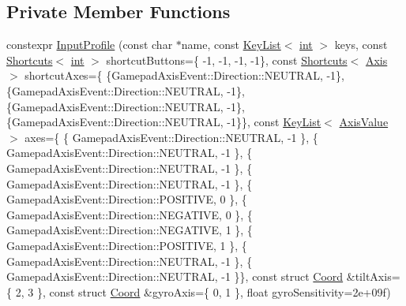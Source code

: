 \subsection*{Private Member Functions}
\begin{DoxyCompactItemize}
\item 
constexpr \mbox{\hyperlink{class_q_g_b_a_1_1_input_profile_a811607e27c5154082ba5bc37953fc96d}{Input\+Profile}} (const char $\ast$name, const \mbox{\hyperlink{class_q_g_b_a_1_1_input_profile_struct_q_g_b_a_1_1_input_profile_1_1_key_list}{Key\+List}}$<$ \mbox{\hyperlink{ioapi_8h_a787fa3cf048117ba7123753c1e74fcd6}{int}} $>$ keys, const \mbox{\hyperlink{class_q_g_b_a_1_1_input_profile_struct_q_g_b_a_1_1_input_profile_1_1_shortcuts}{Shortcuts}}$<$ \mbox{\hyperlink{ioapi_8h_a787fa3cf048117ba7123753c1e74fcd6}{int}} $>$ shortcut\+Buttons=\{ -\/1, -\/1, -\/1, -\/1\}, const \mbox{\hyperlink{class_q_g_b_a_1_1_input_profile_struct_q_g_b_a_1_1_input_profile_1_1_shortcuts}{Shortcuts}}$<$ \mbox{\hyperlink{class_q_g_b_a_1_1_input_profile_struct_q_g_b_a_1_1_input_profile_1_1_axis}{Axis}} $>$ shortcut\+Axes=\{ \{Gamepad\+Axis\+Event\+::\+Direction\+::\+N\+E\+U\+T\+R\+AL, -\/1\}, \{Gamepad\+Axis\+Event\+::\+Direction\+::\+N\+E\+U\+T\+R\+AL, -\/1\}, \{Gamepad\+Axis\+Event\+::\+Direction\+::\+N\+E\+U\+T\+R\+AL, -\/1\}, \{Gamepad\+Axis\+Event\+::\+Direction\+::\+N\+E\+U\+T\+R\+AL, -\/1\}\}, const \mbox{\hyperlink{class_q_g_b_a_1_1_input_profile_struct_q_g_b_a_1_1_input_profile_1_1_key_list}{Key\+List}}$<$ \mbox{\hyperlink{class_q_g_b_a_1_1_input_profile_struct_q_g_b_a_1_1_input_profile_1_1_axis_value}{Axis\+Value}} $>$ axes=\{ \{ Gamepad\+Axis\+Event\+::\+Direction\+::\+N\+E\+U\+T\+R\+AL, -\/1 \}, \{ Gamepad\+Axis\+Event\+::\+Direction\+::\+N\+E\+U\+T\+R\+AL, -\/1 \}, \{ Gamepad\+Axis\+Event\+::\+Direction\+::\+N\+E\+U\+T\+R\+AL, -\/1 \}, \{ Gamepad\+Axis\+Event\+::\+Direction\+::\+N\+E\+U\+T\+R\+AL, -\/1 \}, \{ Gamepad\+Axis\+Event\+::\+Direction\+::\+P\+O\+S\+I\+T\+I\+VE, 0 \}, \{ Gamepad\+Axis\+Event\+::\+Direction\+::\+N\+E\+G\+A\+T\+I\+VE, 0 \}, \{ Gamepad\+Axis\+Event\+::\+Direction\+::\+N\+E\+G\+A\+T\+I\+VE, 1 \}, \{ Gamepad\+Axis\+Event\+::\+Direction\+::\+P\+O\+S\+I\+T\+I\+VE, 1 \}, \{ Gamepad\+Axis\+Event\+::\+Direction\+::\+N\+E\+U\+T\+R\+AL, -\/1 \}, \{ Gamepad\+Axis\+Event\+::\+Direction\+::\+N\+E\+U\+T\+R\+AL, -\/1 \}\}, const struct \mbox{\hyperlink{class_q_g_b_a_1_1_input_profile_struct_q_g_b_a_1_1_input_profile_1_1_coord}{Coord}} \&tilt\+Axis=\{ 2, 3 \}, const struct \mbox{\hyperlink{class_q_g_b_a_1_1_input_profile_struct_q_g_b_a_1_1_input_profile_1_1_coord}{Coord}} \&gyro\+Axis=\{ 0, 1 \}, float gyro\+Sensitivity=2e+09f)
\end{DoxyCompactItemize}
